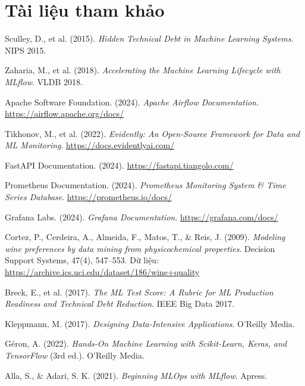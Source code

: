 \documentclass[12pt,a4paper]{report}
\begin{document}
\chapter*{Tài liệu tham khảo}

\begin{enumerate}[label={[\arabic*]}]
  \item Sculley, D., et al. (2015). \textit{Hidden Technical Debt in Machine Learning Systems}. NIPS 2015.

  \item Zaharia, M., et al. (2018). \textit{Accelerating the Machine Learning Lifecycle with MLflow}. VLDB 2018.

  \item Apache Software Foundation. (2024). \textit{Apache Airflow Documentation}. \url{https://airflow.apache.org/docs/}

  \item Tikhonov, M., et al. (2022). \textit{Evidently: An Open-Source Framework for Data and ML Monitoring}. \url{https://docs.evidentlyai.com/}

  \item FastAPI Documentation. (2024). \url{https://fastapi.tiangolo.com/}

  \item Prometheus Documentation. (2024). \textit{Prometheus Monitoring System \& Time Series Database}. \url{https://prometheus.io/docs/}

  \item Grafana Labs. (2024). \textit{Grafana Documentation}. \url{https://grafana.com/docs/}

  \item Cortez, P., Cerdeira, A., Almeida, F., Matos, T., \& Reis, J. (2009). \textit{Modeling wine preferences by data mining from physicochemical properties}. Decision Support Systems, 47(4), 547--553. Dữ liệu: \url{https://archive.ics.uci.edu/dataset/186/wine+quality}

  \item Breck, E., et al. (2017). \textit{The ML Test Score: A Rubric for ML Production Readiness and Technical Debt Reduction}. IEEE Big Data 2017.

  \item Kleppmann, M. (2017). \textit{Designing Data-Intensive Applications}. O'Reilly Media.

  \item Géron, A. (2022). \textit{Hands-On Machine Learning with Scikit-Learn, Keras, and TensorFlow} (3rd ed.). O'Reilly Media.

  \item Alla, S., \& Adari, S. K. (2021). \textit{Beginning MLOps with MLflow}. Apress.
\end{enumerate}
\end{document}
